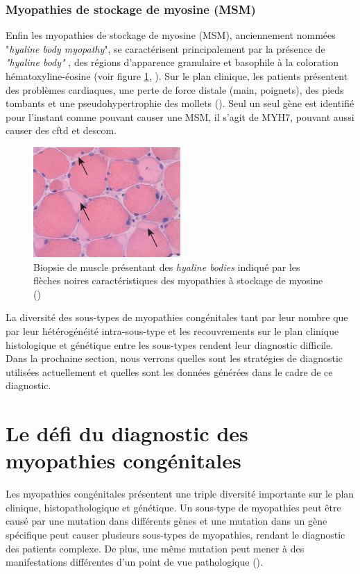\subsubsection{Myopathies de stockage de myosine (MSM)}
Enfin les myopathies de stockage de myosine (MSM), anciennement nommées "\textit{hyaline body myopathy}", se caractérisent principalement  par la présence de \textit{"hyaline body"} , des régions d'apparence granulaire et basophile à la coloration hématoxyline-éosine (voir figure \ref{fig:hyaline}, \cite{claeys_congenital_2020, victor_dubowitz_muscle_2020}).  Sur le plan clinique, les patients présentent des problèmes cardiaques, une perte de force distale (main, poignets), des pieds tombants et une pseudohypertrophie des mollets (\cite{cassandrini_congenital_2017}). Seul un seul gène est identifié pour l'instant comme pouvant causer une MSM, il s'agit de MYH7, pouvant aussi causer des \gls{cftd} et des\gls{com}.
\begin{figure}[!ht]
 \centering
 \includegraphics[width=0.5\textwidth]{figures/hyalin.jpg}
 \caption[Biopsie de muscle des \textit{hyaline bodies}]{Biopsie de muscle présentant des \textit{hyaline bodies} indiqué par les flèches noires caractéristiques des myopathies à stockage de myosine (\cite{victor_dubowitz_muscle_2020})}
 \label{fig:hyaline}
\end{figure}

La diversité des sous-types de myopathies congénitales tant par leur nombre que par leur hétérogénéité intra-sous-type et les recouvrements sur le plan clinique histologique et génétique entre les sous-types rendent leur diagnostic difficile. Dans la prochaine section, nous verrons quelles sont les stratégies de diagnostic utilisées actuellement et quelles sont les données générées dans le cadre de ce diagnostic.

\section{Le défi du diagnostic des myopathies congénitales}
Les myopathies congénitales présentent une triple diversité importante sur le plan clinique, histopathologique et génétique. Un sous-type de myopathies peut être causé par une mutation dans différents gènes et une mutation dans un gène spécifique peut causer plusieurs sous-types de myopathies, rendant le diagnostic des patients complexe. De plus, une même mutation peut mener à des manifestations différentes d'un point de vue pathologique (\cite{north_approach_2014}). 


